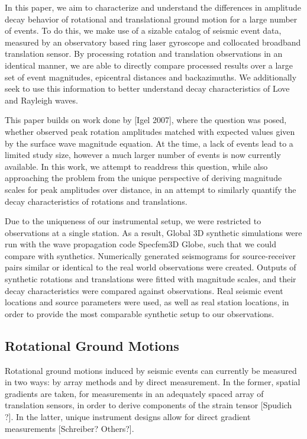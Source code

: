 \documentclass{gji}
\begin{document}
In this paper, we aim to characterize and understand the differences in amplitude decay behavior of rotational and translational ground motion for a large number of events. To do this, we make use of a sizable catalog of seismic event data, measured by an observatory based ring laser gyroscope and collocated broadband translation sensor. By processing rotation and translation observations in an identical manner, we are able to directly compare processed results over a large set of event magnitudes, epicentral distances and backazimuths. We additionally seek to use this information to better understand decay characteristics of Love and Rayleigh waves.

This paper builds on work done by [Igel 2007], %
where the question was posed, whether observed peak rotation amplitudes matched with expected values given by the surface wave magnitude equation. At the time, a lack of events lead to a limited study size, however a much larger number of events is now currently available. In this work, we attempt to readdress this question, while also approaching the problem from the unique perspective of deriving magnitude scales for peak amplitudes over distance, in an attempt to similarly quantify the decay characteristics of rotations and translations.

Due to the uniqueness of our instrumental setup, we were restricted to observations at a single station. As a result, Global 3D synthetic simulations were run with the wave propagation code Specfem3D Globe, such that we could compare with synthetics. Numerically generated seismograms for source-receiver pairs similar or identical to the real world observations were created. Outputs of synthetic rotations and translations were fitted with magnitude scales, and their decay characteristics were compared against observations. Real seismic event locations and source parameters were used, as well as real station locations, in order to provide the most comparable synthetic setup to our observations.



\subsection{Rotational Ground Motions}
Rotational ground motions induced by seismic events can currently be measured in two ways: by array methods and by direct measurement. %
In the former, spatial gradients are taken, for measurements in an adequately spaced array of translation sensors, in order to derive components of the strain tensor [Spudich ?]. In the latter, unique instrument designs allow for direct gradient measurements [Schreiber? Others?]. %
\end{document}

